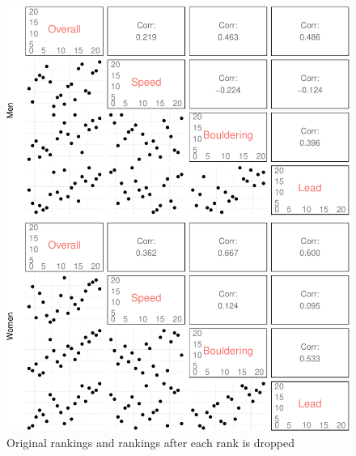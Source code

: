 \documentclass[12pt]{article}
\begin{document}
\begin{figure}
\centering
\includegraphics{draft_files/figure-latex/unnamed-chunk-12-1.pdf}
\caption{Original rankings and rankings after each rank is dropped}
\end{figure}



\end{document}
